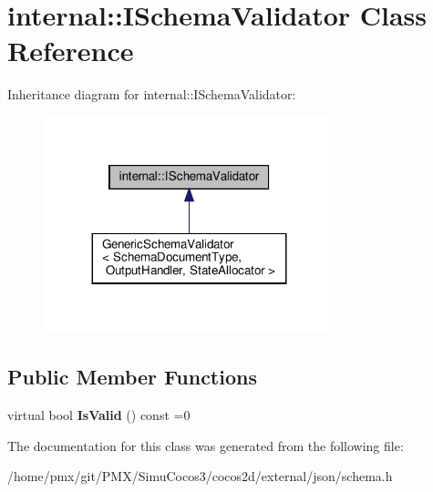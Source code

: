 \hypertarget{classinternal_1_1ISchemaValidator}{}\section{internal\+:\+:I\+Schema\+Validator Class Reference}
\label{classinternal_1_1ISchemaValidator}


Inheritance diagram for internal\+:\+:I\+Schema\+Validator\+:
\nopagebreak
\begin{figure}[H]
\begin{center}
\leavevmode
\includegraphics[width=239pt]{classinternal_1_1ISchemaValidator__inherit__graph}
\end{center}
\end{figure}
\subsection*{Public Member Functions}
\begin{DoxyCompactItemize}
\item 
\mbox{\label{classinternal_1_1ISchemaValidator_a94f61f24b1447497279ef12ee0127285}} 
virtual bool {\bfseries Is\+Valid} () const =0
\end{DoxyCompactItemize}


The documentation for this class was generated from the following file\+:\begin{DoxyCompactItemize}
\item 
/home/pmx/git/\+P\+M\+X/\+Simu\+Cocos3/cocos2d/external/json/schema.\+h\end{DoxyCompactItemize}
